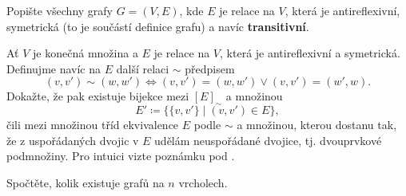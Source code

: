 \begin{exercise}
 Popište všechny grafy $G = (V,E)$, kde $E$ je relace na $V$, která je
 antireflexivní, symetrická (to je součástí definice grafu) a navíc
 \textbf{transitivní}.
\end{exercise}

\begin{exercise}
 Ať $V$ je konečná množina a $E$ je relace na $V$, která je antireflexivní a
 symetrická. Definujme navíc na $E$ další relaci $ \sim $ předpisem
 \[
  (v,v') \sim (w,w') \Leftrightarrow (v,v') = (w,w') \vee (v,v') = (w',w). 
 \]
 Dokažte, že pak existuje bijekce mezi $[E]_{ \sim }$ a množinou
 \[
  E' \coloneqq \{\{v,v'\} \mid (v,v') \in E\},
 \]
 čili mezi množinou tříd ekvivalence $E$ podle $ \sim $ a množinou, kterou
 dostanu tak, že z uspořádaných dvojic v $E$ udělám neuspořádané dvojice, tj.
 dvouprvkové podmnožiny. Pro intuici vizte poznámku pod
 .
\end{exercise}

\begin{exercise}
 Spočtěte, kolik existuje grafů na $n$ vrcholech.
\end{exercise}






